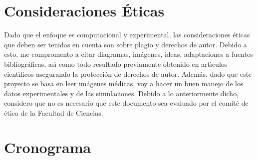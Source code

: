 \documentclass[12pt]{article}
\begin{document}
\section{Consideraciones \'Eticas}

Dado que el enfoque es computacional y experimental, las consideraciones éticas que deben ser tenidas en cuenta son sobre plagio y derechos de autor. Debido a esto, me compromento a citar diagramas, imágenes, ideas, adaptaciones a fuentes bibliográficas, ası́ como todo resultado previamente obtenido en artı́culos cientı́ficos asegurando la protección de derechos de autor. Además, dado que este proyecto se basa en leer imágenes médicas, voy a hacer un buen manejo de los datos experimentales y de las simulaciones. Debido a lo anteriormente dicho, considero que no es necesario que este documento sea evaluado por el comité de ética de la Facultad de Ciencias.   


\section{Cronograma}
\end{document}
